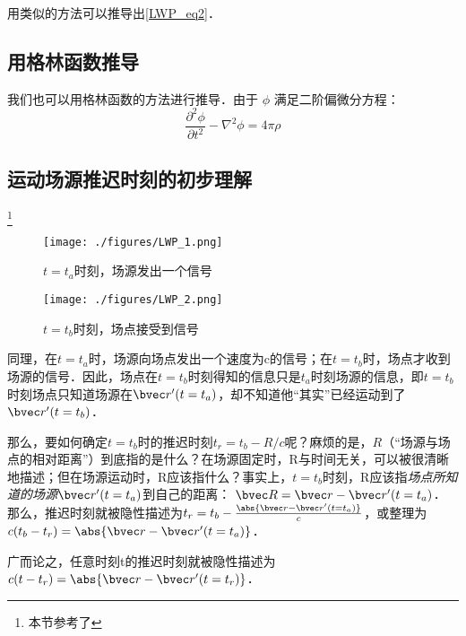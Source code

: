 用类似的方法可以推导出\autoref{LWP_eq2}．

\subsection{用格林函数推导}
我们也可以用格林函数的方法进行推导．由于 $\phi$ 满足二阶偏微分方程：
\begin{equation}
\frac{\partial^2 \phi}{\partial t^2}-\nabla^2 \phi= 4\pi \rho
\end{equation}

\subsection{运动场源推迟时刻的初步理解}
\footnote{本节参考了\cite{GriffE}}
\begin{figure}[ht]
\centering
\texttt{[image: ./figures/LWP\_1.png]}
\caption{$t=t_a$时刻，场源发出一个信号} \label{LWP_fig1}
\end{figure}
\begin{figure}[ht]
\centering
\texttt{[image: ./figures/LWP\_2.png]}
\caption{$t=t_b$时刻，场点接受到信号} \label{LWP_fig2}
\end{figure}
同理，在$t=t_a$时，场源向场点发出一个速度为c的信号；在$t=t_b$时，场点才收到场源的信号．因此，场点在$t=t_b$时刻得知的信息只是$t_a$时刻场源的信息，即$t=t_b$时刻场点只知道场源在$\bvec r'(t=t_a)$，却不知道他“其实”已经运动到了$\bvec r'(t=t_b)$．

那么，要如何确定$t=t_b$时的推迟时刻$t_r=t_b-R/c$呢？麻烦的是，$R$（“场源与场点的相对距离”）到底指的是什么？在场源固定时，R与时间无关，可以被很清晰地描述；但在场源运动时，R应该指什么？事实上，$t=t_b$时刻，R应该指\textsl{场点所知道的场源}$\bvec r'(t=t_a)$到自己的距离： $\bvec R = \bvec r - \bvec r'(t=t_a)$．
那么，推迟时刻就被隐性描述为$t_r=t_b-\frac{\abs{\bvec r - \bvec r'(t=t_a)}}{c}$，或整理为$c(t_b-t_r)=\abs{\bvec r - \bvec r'(t=t_a)}$．

广而论之，任意时刻t的推迟时刻就被隐性描述为$c(t-t_r)=\abs{\bvec r - \bvec r'(t=t_r)}$．

